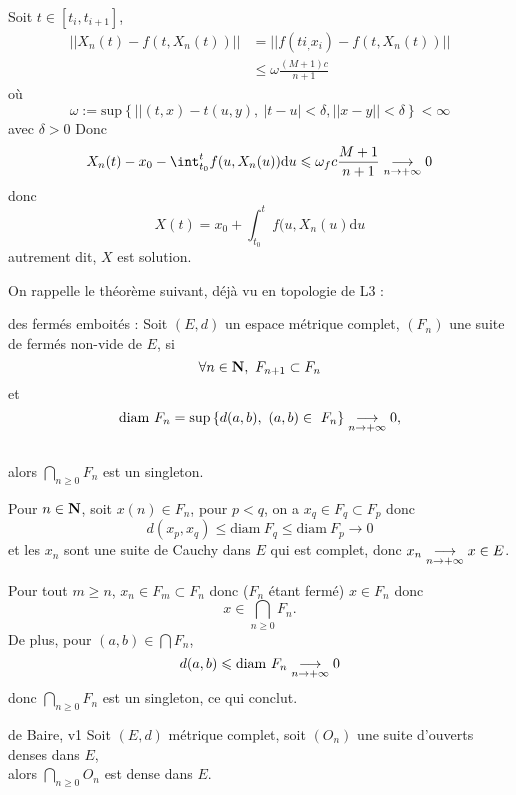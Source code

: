 \documentclass[a4paper,11pt, twoside]{article}
\begin{document}
\begin{Proof}
  Soit $t\in[t_i,t_{i+1}]$,
  \begin{align*}
    ||X_n(t)-f(t,X_n(t))||&=||f(ti_,x_i)-f(t,X_n(t))||\\
    &\leqslant \omega \frac{(M+1)c}{n+1}
  \end{align*}
  où 
  $$\omega :=\mathrm{sup}\left\{||(t,x)-t(u,y),\ |t-u|<\delta, ||x-y||<\delta\right\}<\infty$$
  avec $\delta>0$
  Donc 
  $$X_n(t)-x_0-\int_{t_0}^tf(u,X_n(u))\mathrm du\leqslant \omega_fc\frac{M+1}{n+1}\tend 0$$
  donc 
  $$X(t)=x_0+\int_{t_0}^tf(u,X_n(u)\mathrm du$$
  autrement dit, $X$ est solution.
\end{Proof}





\setcounter{prop}{0}





On rappelle le théorème suivant, déjà vu en topologie de L3 : 

\begin{thC}{des fermés emboités :}
  Soit $(E,d)$ un espace métrique complet, $(F_n)$ une suite de fermés non-vide de $E$, si
  $$\forall n\in\mathbf N,\ F_{n+1}\subset F_n$$
  et
  $$\mathrm{diam}\ F_n=\mathrm{sup}\left\{d(a,b),\ (a,b)\in\ F_n\right\}\tend 0,$$\\

  alors $\bigcap_{n\geqslant 0}F_n$ est un singleton.
\end{thC}

\begin{Proof}
  Pour $n\in\mathbf N$, soit $x(n)\in F_n$, pour $p<q$, on a $x_q\in F_q\subset F_p$ donc 
  $$d(x_p,x_q)\leqslant \mathrm{diam}\ F_q\leqslant \mathrm{diam}\ F_p\longrightarrow 0$$
  et les $x_n$ sont une suite de Cauchy dans $E$ qui est complet, donc $x_n\underset{n\to+\infty}{\longrightarrow} x\in E$.

  Pour tout $m\geqslant n$, $x_n\in F_m\subset F_n$ donc ($F_n$ étant fermé) $x\in F_n$ donc 
  $$x\in \bigcap_{n\geqslant 0}F_n.$$
  De plus, pour $(a,b)\in \bigcap F_n$, 
  $$d(a,b)\leqslant \mathrm{diam}\ F_n\underset{n\to+\infty}{\longrightarrow} 0$$
  donc $\bigcap_{n\geqslant 0} F_n$ est un singleton, ce qui conclut.
\end{Proof}

\begin{thC}{de Baire, v1}
  Soit $(E,d)$ métrique complet, soit $(O_n)$ une suite d'ouverts denses dans $E$,\\

  alors 
  $\bigcap_{n\geqslant 0}O_n$ est dense dans $E$.
\end{thC}
\end{document}
